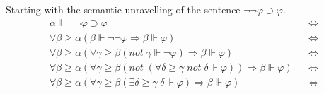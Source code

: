 \documentclass[11pt,a4paper]{article}
\newcommand{\lto}{\supset}
\newcommand{\sneg}{not \;}
\newcommand{\sto}{\Rightarrow}
\begin{document}
Starting with the semantic unravelling of the sentence $\neg \neg \varphi \lto \varphi$.
\begin{align*}
&\alpha \Vdash \neg \neg \varphi \lto \varphi   && \iff & \\
&\forall \beta \geqslant \alpha (\beta \Vdash \neg \neg \varphi \sto  \beta \Vdash \varphi )  && \iff & \\
&\forall \beta \geqslant \alpha ( \forall \gamma \geqslant \beta (\sneg \gamma \Vdash \neg \varphi) \sto  \beta \Vdash \varphi )  && \iff & \\
&\forall \beta \geqslant \alpha ( \forall \gamma \geqslant \beta (\sneg (\forall \delta \geqslant \gamma \; \sneg \delta \Vdash \varphi )) \sto  \beta \Vdash \varphi )  && \iff & \\
&\forall \beta \geqslant \alpha ( \forall \gamma \geqslant \beta (\exists \delta \geqslant \gamma \; \delta \Vdash  \varphi ) \sto  \beta \Vdash \varphi )  && \iff & \\
\end{align*}
\end{document}
